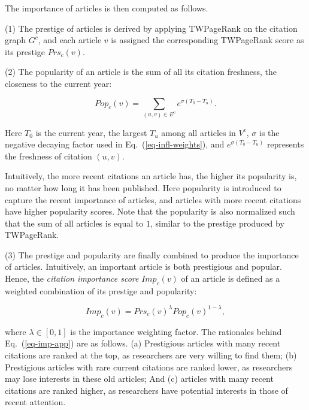 The importance of articles is then computed as follows.

\sstab(1) The prestige of articles is derived by applying TWPageRank on the citation graph $G^c$, and each article $v$ is assigned the corresponding TWPageRank score as its prestige $Prs_c(v)$.

\sstab(2)  The popularity of an article is the sum of all its citation freshness, \ie the closeness to the current year:

\vspace{-1ex}
\begin{small}
\begin{equation}\label{eq-pop-app}
Pop_c(v) = \sum_{{(u,v)\in E^c}} {e^{\sigma (T_0-T_u)}}.
\end{equation}
\end{small}
\noindent
Here $T_0$ is the current year, \ie the largest $T_u$ among all articles in $V^c$, $\sigma$ is the negative decaying factor used in Eq.~(\ref{eq-infl-weights}), and $e^{\sigma (T_0-T_u)}$ represents the freshness of citation $(u,v)$.

Intuitively, the more recent citations an article has, the higher its popularity is, no matter how long it has been published.
Here popularity is introduced to capture the recent importance of articles, and articles with more recent citations have higher popularity scores.
%
Note that the popularity is also normalized such that the sum of  all articles is equal to $1$, similar to the prestige produced by TWPageRank.

\sstab(3) The prestige and popularity are finally combined to produce the importance of articles. Intuitively, an important article is both prestigious and popular. Hence, the {\em citation importance score} $Imp_c(v)$ of an article is defined as a weighted combination of its prestige and popularity:

\vspace{-1ex}
\begin{small}
\begin{equation}\label{eq-imp-app}
Imp_c(v) = Prs_c(v)^\lambda Pop_c(v)^{1-\lambda},
\end{equation}
\end{small}
\noindent where $\lambda \in [0,1]$ is the importance weighting factor.
The rationales behind Eq.~(\ref{eq-imp-app}) are as follows. (a) Prestigious articles with many recent citations are ranked at the top, as researchers are very willing to find them; (b) Prestigious articles with rare current citations are ranked lower, as researchers may lose interests in these old articles; And (c) articles with many recent citations are ranked higher, as researchers have potential interests in those of recent attention.



